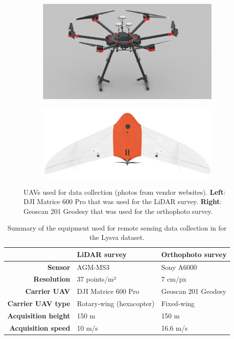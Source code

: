\begin{figure}
\centering
\begin{subfigure}[b]{0.45\textwidth}
    \centering
    \includegraphics[width=\textwidth]{../images/dji-matrice-600-pro.jpeg}
\end{subfigure}
\hfill
\begin{subfigure}[b]{0.45\textwidth}
    \centering
    \includegraphics[width=\textwidth]{../images/geoscan_201_geodesy.jpg}
\end{subfigure}
\caption[UAVs used for data collection.]{
    UAVs used for data collection (photos from vendor websites).
    \textbf{Left}: DJI Matrice 600 Pro that was used for the LiDAR survey.
    \textbf{Right}: Geoscan 201 Geodesy that was used for the orthophoto survey.
}
\label{fig-uavs}
\end{figure}

\begin{table}
    \centering
    \caption{Summary of the equipment used for remote sensing data collection in for the Lysva dataset.}
    \label{tbl-lysva-equipment}
    \begin{tabular}{rll}
        & \textbf{LiDAR survey} & \textbf{Orthophoto survey} \\
        \toprule
        \textbf{Sensor} & AGM-MS3 & Sony A6000 \\
        \textbf{Resolution} & 37 points/m² & 7 cm/px \\
        \textbf{Carrier UAV} & DJI Matrice 600 Pro & Geoscan 201 Geodesy \\
        \textbf{Carrier UAV type} & Rotary-wing (hexacopter) & Fixed-wing \\
        \textbf{Acquisition height} & 150 m & 150 m \\
        \textbf{Acquisition speed} & 10 m/s & 16.6 m/s \\
        \bottomrule
    \end{tabular}
\end{table}

